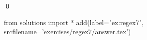 
\begin{ex} 
  \label{ex:regex7}
  
  \qed
\end{ex} 
\begin{python0}
from solutions import *
add(label="ex:regex7",
    srcfilename='exercises/regex7/answer.tex') 
\end{python0}
